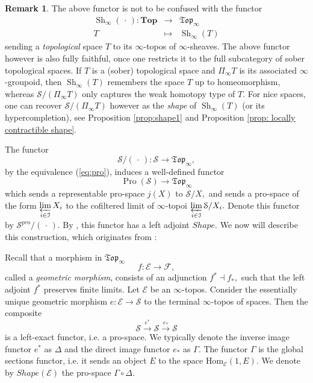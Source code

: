 \documentclass[12pt]{amsart}
\theoremstyle{definition}
\newtheorem{remark}[dummy]{Remark}
\newcommand{\cE}{\mathcal{E}}
\newcommand{\cF}{\mathcal{F}}
\newcommand{\cI}{\mathcal{I}}
\newcommand{\cS}{\mathcal{S}}
\newcommand{\Sh}{\operatorname{Sh}}
\newcommand{\Hom}{\mathrm{Hom}}
\def\Top{\mathbf{Top}}
\renewcommand{\i}{\infty}
\def\Pro{\operatorname{Pro}}
\def\Shi{\Sh_\i}
\renewcommand{\lim}{\varprojlim\mspace{3mu}}
\def\Shape{\mathit{Shape}}
\def\Top{\mathbf{Top}}
\begin{document}
\begin{remark}
The above functor is not to be confused with the functor
\begin{eqnarray*}
\Sh_\i\left(\mspace{3mu}\cdot\mspace{3mu}\right):\Top &\to& \mathfrak{Top}_\i\\
T &\mapsto& \Shi\left(T\right)
\end{eqnarray*}
sending a \emph{topological} space $T$ to its $\i$-topos of $\i$-sheaves. The above functor however is also fully faithful, once one restricts it to the full subcategory of sober topological spaces. If $T$ is a (sober) topological space and $\Pi_\i T$ is its associated $\i$-groupoid, then $\Shi\left(T\right)$ remembers the space $T$ up to homeomorphism, whereas $\cS/\left(\Pi_\i T\right)$ only captures the weak homotopy type of $T$. For nice spaces, one can recover $\cS/\left(\Pi_\i T\right)$ however as the \emph{shape} of $\Shi\left(T\right)$ (or its hypercompletion), see Proposition \ref{prop:shape1} and Proposition \ref{prop: locally contractible shape}.
\end{remark}

The functor $$\cS/\left(\mspace{3mu}\cdot\mspace{3mu}\right): \cS \to \mathfrak{Top}_\i,$$ by the equivalence (\ref{eq:pro}), induces a well-defined functor $$\Pro\left(\cS\right) \to \mathfrak{Top}_\i$$ which sends a representable pro-space $j\left(X\right)$ to $\cS/X,$ and sends a pro-space of the form $\underset{ i \in \cI} \lim X_i$ to the cofiltered limit of $\i$-topoi $\underset{ i \in \cI} \lim \cS/X_i.$ Denote this functor by $\cS^{pro}/\left(\mspace{3mu}\cdot\mspace{3mu}\right).$ By \cite[Remark 7.1.6.15]{htt}, this functor has a left adjoint $\Shape.$ We now will describe this construction, which originates from \cite{ToVe}:

Recall that a morphism in $\mathfrak{Top}_\i$ $$f:\cE \to \cF,$$ called a \emph{geometric morphism}, consists of an adjunction $f^* \dashv f_*,$ such that the left adjoint $f^*$ preserves finite limits. Let $\cE$ be an $\i$-topos. Consider the essentially unique geometric morphism $e:\cE \to \cS$ to the terminal $\i$-topos of spaces. Then the composite $$\cS \stackrel{e^*}{\longrightarrow} \cS \stackrel{e_*}{\longrightarrow} \cS$$ is a left-exact functor, i.e. a pro-space. We typically denote the inverse image functor $e^*$ as $\Delta$ and the direct image functor $e_*$ as $\Gamma.$ The functor $\Gamma$ is the global sections functor, i.e. it sends an object $E$ to the space $\Hom_{\cE}\left(1,E\right).$
We denote by $\Shape\left(\cE\right)$ the pro-space $\Gamma\circ \Delta.$
\end{document}
